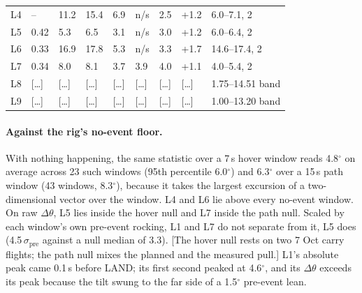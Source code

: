 \begin{table}[htbp]
\begin{tabularx}{\textwidth}{lYYYYYYYY}
    L4 & -- & 11.2 & 15.4 & 6.9 & n/s & 2.5 & +1.2 & 6.0--7.1, 2 \\ %
    L5 & 0.42 & 5.3 & 6.5 & 3.1 & n/s & 3.0 & +1.2 & 6.0--6.4, 2 \\ %
    L6 & 0.33 & 16.9 & 17.8 & 5.3 & n/s & 3.3 & +1.7 & 14.6--17.4, 2 \\ %
    L7 & 0.34 & 8.0 & 8.1 & 3.7 & 3.9 & 4.0 & +1.1 & 4.0--5.4, 2 \\ %
    L8 & [\dots] & [\dots] & [\dots] & [\dots] & [\dots] & [\dots] & [\dots] & 1.75--14.51 band \\
    L9 & [\dots] & [\dots] & [\dots] & [\dots] & [\dots] & [\dots] & [\dots] & 1.00--13.20 band \\
    \bottomrule
  \end{tabularx}
\end{table}

\paragraph{Against the rig's no-event floor.} With nothing happening, the same statistic over a 7\,s hover window
reads 4.8$^\circ$ on average across 23 such windows (95th percentile 6.0$^\circ$) and 6.3$^\circ$ over a 15\,s path
window (43 windows, 8.3$^\circ$), because it takes the largest excursion of a two-dimensional vector over the window.
L4 and L6 lie above every no-event window. On raw $\Delta\theta$, L5 lies inside the hover null and L7 inside the
path null. Scaled by each window's own pre-event rocking, L1 and L7 do not separate from it, L5 does
(4.5\,$\sigma_\mathrm{pre}$ against a null median of 3.3). [The hover null rests on two 7 Oct carry flights; the path
null mixes the planned and the measured pull.] L1's absolute peak came 0.1\,s before LAND; its first second peaked at
4.6$^\circ$, and its $\Delta\theta$ exceeds its peak because the tilt swung to the far side of a 1.5$^\circ$ pre-event
lean.

